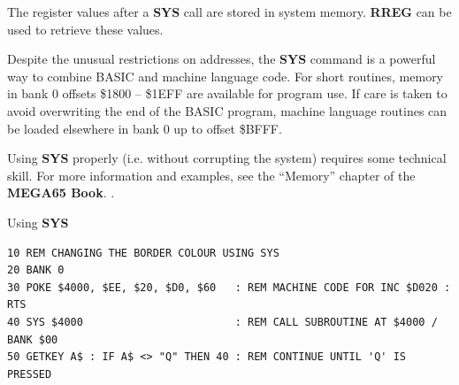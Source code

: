 \begin{description}[leftmargin=2cm,style=nextline]
\item [Remarks:]  The register values after a {\bf SYS} call are stored in system memory. {\bf RREG} can be used to retrieve these values.

                  Despite the unusual restrictions on addresses, the {\bf SYS} command is a powerful way to combine BASIC and machine language code. For short routines, memory in bank 0 offsets \$1800 -- \$1EFF are available for program use. If care is taken to avoid overwriting the end of the BASIC program, machine language routines can be loaded elsewhere in bank 0 up to offset \$BFFF.

                  Using {\bf SYS} properly (i.e. without corrupting the system) requires some technical skill. For more information and examples, see \ifdefined\printmanual
                     the ``Memory'' chapter of the {\bf MEGA65 Book}.
                  \else
                     .
                  \fi

\item [Example:]  Using {\bf SYS}

\begin{tcolorbox}[colback=black,coltext=white]
\verbatimfont{\codefont}
\begin{verbatim}
10 REM CHANGING THE BORDER COLOUR USING SYS
20 BANK 0
30 POKE $4000, $EE, $20, $D0, $60   : REM MACHINE CODE FOR INC $D020 : RTS
40 SYS $4000                        : REM CALL SUBROUTINE AT $4000 / BANK $00
50 GETKEY A$ : IF A$ <> "Q" THEN 40 : REM CONTINUE UNTIL 'Q' IS PRESSED
\end{verbatim}
\end{tcolorbox}
\end{description}


\newpage
